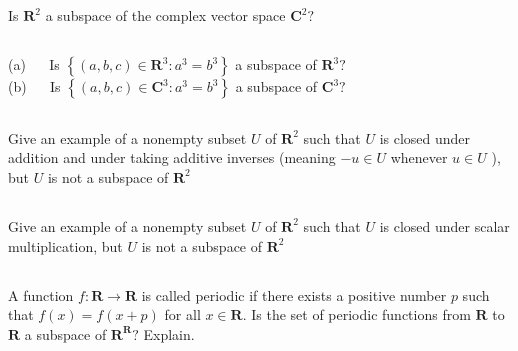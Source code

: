 \documentclass[a4paper]{article}
\begin{document}
\subsection{}
Is $\mathbf{R}^{2}$ a subspace of the complex vector space $\mathbf{C}^{2} ?$
\paragraph{}

\subsection{}
(a) $\quad$ Is $\left\{(a, b, c) \in \mathbf{R}^{3}: a^{3}=b^{3}\right\}$ a subspace of $\mathbf{R}^{3} ?$\\
(b) $\quad$ Is $\left\{(a, b, c) \in \mathbf{C}^{3}: a^{3}=b^{3}\right\}$ a subspace of $\mathbf{C}^{3} ?$
\paragraph{}

\subsection{}
Give an example of a nonempty subset $U$ of $\mathbf{R}^{2}$ such that $U$ is closed under addition and under taking additive inverses (meaning $-u \in U$ whenever $u \in U$ ), but $U$ is not a subspace of $\mathbf{R}^{2}$
\paragraph{}

\subsection{}
Give an example of a nonempty subset $U$ of $\mathbf{R}^{2}$ such that $U$ is closed under scalar multiplication, but $U$ is not a subspace of $\mathbf{R}^{2}$
\paragraph{}

\subsection{}
A function $f: \mathbf{R} \rightarrow \mathbf{R}$ is called periodic if there exists a positive number $p$ such that $f(x)=f(x+p)$ for all $x \in \mathbf{R} .$ Is the set of periodic functions from $\mathbf{R}$ to $\mathbf{R}$ a subspace of $\mathbf{R}^{\mathbf{R}} ?$ Explain.
\end{document}

